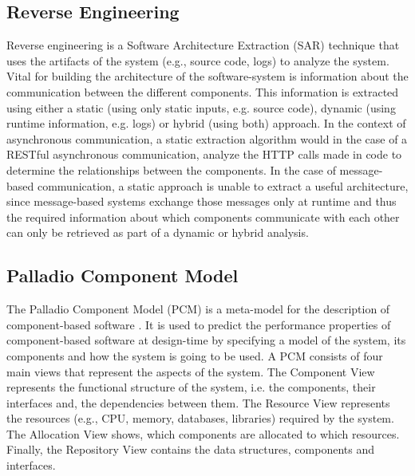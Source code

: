 \subsection{Reverse Engineering}
\label{sec:Foundation:SAR}
Reverse engineering is a Software Architecture Extraction (SAR) technique that uses the artifacts of the system (e.g., source code, logs) to analyze the system.
Vital for building the architecture of the software-system is information about the communication between the different components.
This information is extracted using either a static (using only static inputs, e.g. source code), dynamic (using runtime information, e.g. logs) or hybrid (using both) approach.
In the context of asynchronous communication, a static extraction algorithm would in the case of a RESTful asynchronous communication, analyze the HTTP calls made in code to determine the relationships between the components.
In the case of message-based communication, a static approach is unable to extract a useful architecture, since message-based systems exchange those messages only at runtime and thus the required information about which components communicate with each other can only be retrieved as part of a dynamic or hybrid analysis. \cite{Singh2021,Mayer2018}


\subsection{Palladio Component Model}
\label{sec:Foundation:PCM}
The Palladio Component Model (PCM) is a meta-model for the description of component-based software \cite{Becker2008}.
It is used to predict the performance properties of component-based software at design-time by specifying a model of the system, its components and how the system is going to be used.
A PCM consists of four main views that represent the aspects of the system.
The Component View represents the functional structure of the system, i.e. the components, their interfaces and, the dependencies between them.
The Resource View represents the resources (e.g., CPU, memory, databases, libraries) required by the system.
The Allocation View shows, which components are allocated to which resources.
Finally, the Repository View contains the data structures, components and interfaces. \cite{Becker2008}
